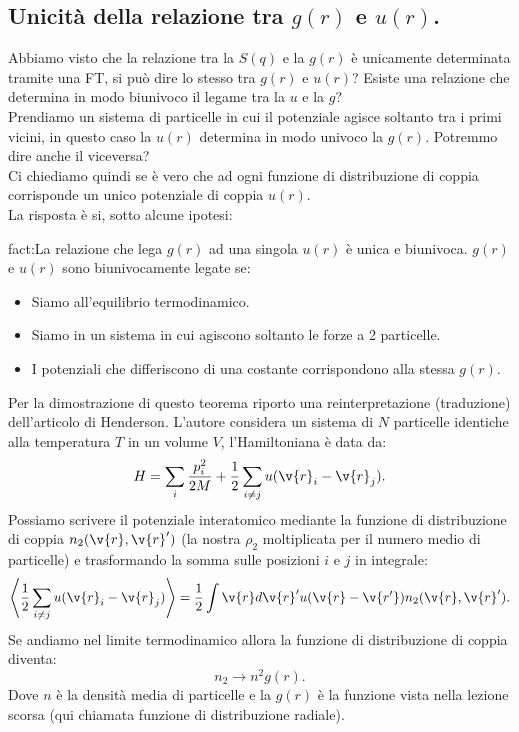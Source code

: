 \subsection{Unicità della relazione tra $g(r)$ e $u(r)$.}
\label{subsec:Unicità della relazione tra $g(r)$ e $u(r)$.}
Abbiamo visto che la relazione tra la $S(q)$ e la $g(r)$ è unicamente determinata tramite una FT, si può dire lo stesso tra $g(r)$ e $u(r)$? Esiste una relazione che determina in modo biunivoco il legame tra la $u$ e la $g$?\\
Prendiamo un sistema di particelle in cui il potenziale agisce soltanto tra i primi vicini, in questo caso la $u(r)$ determina in modo univoco la $g(r)$. Potremmo dire anche il viceversa?\\
Ci chiediamo quindi se è vero che ad ogni funzione di distribuzione di coppia corrisponde un unico potenziale di coppia $u(r)$.\\
La risposta è si, sotto alcune ipotesi:
\begin{fact}{fact:La relazione che lega $g(r)$ ad una singola $u(r)$ è unica e biunivoca.}
	$g(r)$ e $u(r)$ sono biunivocamente legate se:
	\begin{itemize}
		\item Siamo all'equilibrio termodinamico.
		\item Siamo in un sistema in cui agiscono soltanto le forze a 2 particelle.
		\item I potenziali che differiscono di una costante corrispondono alla
			stessa $g(r)$.
	\end{itemize}
\end{fact}
Per la dimostrazione di questo teorema riporto una reinterpretazione (traduzione) dell'articolo di Henderson. L'autore considera un sistema di $N$ particelle identiche alla temperatura $T$ in un volume $V$, l'Hamiltoniana è data da:
\[
    H = \sum_{i}^{} \frac{p^2_i}{2M}+ \frac{1}{2}\sum_{i\neq j}^{} u(\v{r}_i-\v{r}_j) 
.\] 
Possiamo scrivere il potenziale interatomico mediante la funzione di distribuzione di coppia $n_2(\v{r},\v{r}')$ (la nostra $\rho_2$ moltiplicata per il numero medio di particelle) e trasformando la somma sulle posizioni $i$  e $j$  in integrale:
\[
    \left<\frac{1}{2}\sum_{i\neq j}^{} u(\v{r}_i-\v{r}_j)\right> = \frac{1}{2}\int \v{r}d\v{r}'u(\v{r}-\v{r'}) n_2(\v{r},\v{r}') 
.\] 
Se andiamo nel limite termodinamico allora la funzione di distribuzione di coppia diventa:
\[
    n_2 \to n^2g(r) 
.\] 
Dove $n$ è la densità media di particelle e la $g(r)$ è la funzione vista nella lezione scorsa (qui chiamata funzione di distribuzione radiale).
